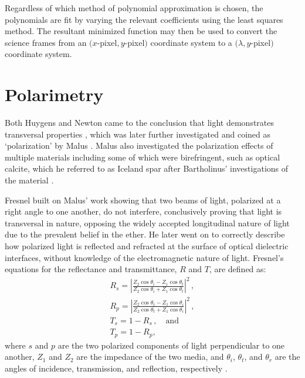 Regardless of which method of polynomial approximation is chosen, the polynomials are fit by varying the relevant coefficients using the least squares method. The resultant minimized function may then be used to convert the science frames from an $(x$-pixel$, y$-pixel$)$ coordinate system to a $(\lambda, y$-pixel$)$ coordinate system.


\section{Polarimetry}\label{sec:polarimetry}

Both Huygens and Newton came to the conclusion that light demonstrates transversal properties \citep{Huygens, opticks}, which was later further investigated and coined as `polarization' by Malus \citep{Pol_Malus}. Malus also investigated the polarization effects of multiple materials including some of which were birefringent, such as optical calcite, which he referred to as Iceland spar after Bartholinus' investigations of the material \citep{Bartholinus}.


Fresnel built on Malus' work showing that two beams of light, polarized at a right angle to one another, do not interfere, conclusively proving that light is transversal in nature, opposing the widely accepted longitudinal nature of light due to the prevalent belief in the ether. He later went on to correctly describe how polarized light is reflected and refracted at the surface of optical dielectric interfaces, without knowledge of the electromagnetic nature of light. Fresnel's equations for the reflectance and transmittance, $R$ and $T$, are defined as:
\begin{equation}
    \begin{gathered}
        R_{s} = \left\lvert \frac{Z_{2} \cos{\theta_{i}} - Z_{1} \cos{\theta_{t}}}{Z_{2} \cos{\theta_{i}} + Z_{1} \cos{\theta_{t}}} \right\rvert^{2}\,,\\
        R_{p} = \left\lvert \frac{Z_{2} \cos{\theta_{t}} - Z_{1} \cos{\theta_{i}}}{Z_{2} \cos{\theta_{t}} + Z_{1} \cos{\theta_{i}}} \right\rvert^{2}\,,\\
        T_{s} = 1 - R_{s}\,,\quad\text{and}\\
        T_{p} = 1 - R_{p},
    \end{gathered}\label{eq:Fresnel}
\end{equation}
where $s$ and $p$ are the two polarized components of light perpendicular to one another, $Z_{1}$ and $Z_{2}$ are the impedance of the two media, and $\theta_{i}$, $\theta_{t}$, and $\theta_{r}$ are the angles of incidence, transmission, and reflection, respectively \citep{Fresnel}.

